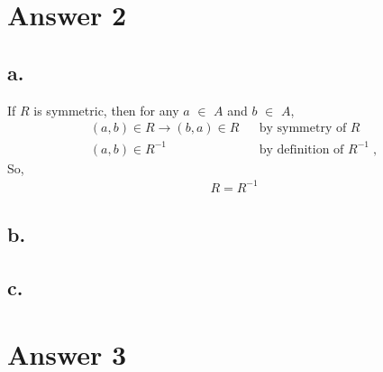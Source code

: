 \documentclass[12pt]{article}
\begin{document}
\section*{Answer 2}

\subsection*{a.}
If $R$ is symmetric, then for any $a$ $\in$ $A$ and $b$ $\in$ $A$,
\begin{align*}
(a,b) \in R \rightarrow (b,a) \in R &&\text{by symmetry of }R\\
                        (a,b) \in R^{-1} &&\text{by definition of }R^{-1}\;,
\end{align*}
So,
\begin{align*}
R=R^{-1}
\end{align*}

\subsection*{b.}

\subsection*{c.}



\section*{Answer 3}
\end{document}
